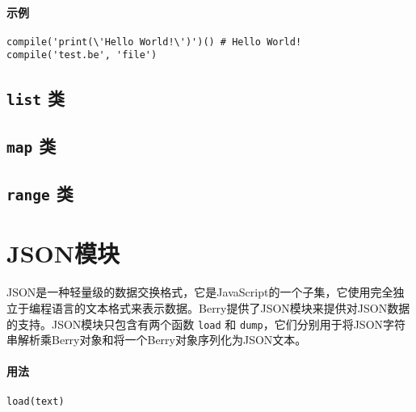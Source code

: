 \paragraph{示例}
\begin{lstlisting}[language=berry, numbers=none]
compile('print(\'Hello World!\')')() # Hello World!
compile('test.be', 'file')
\end{lstlisting}


\subsection{\texttt{list} 类}

\subsection{\texttt{map} 类}

\subsection{\texttt{range} 类}

\section{JSON模块}

JSON是一种轻量级的数据交换格式，它是JavaScript的一个子集，它使用完全独立于编程语言的文本格式来表示数据。Berry提供了JSON模块来提供对JSON数据的支持。JSON模块只包含有两个函数 \texttt{load} 和 \texttt{dump}，它们分别用于将JSON字符串解析乘Berry对象和将一个Berry对象序列化为JSON文本。


\paragraph{用法}
\begin{lstlisting}[language=berry, numbers=none]
load(text)
\end{lstlisting}

